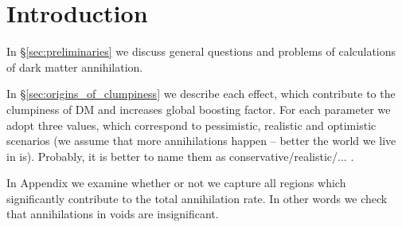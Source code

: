\section{Introduction}

In \S\ref{sec:preliminaries} we discuss general questions and problems of calculations of dark matter annihilation.

In \S\ref{sec:origins_of_clumpiness} we describe each effect, which contribute to the clumpiness of DM and increases global boosting factor. For each parameter we adopt three values, which correspond to pessimistic, realistic and optimistic scenarios (we assume that more annihilations happen -- better the world we live in is). Probably, it is better to name them as conservative/realistic/... .

In Appendix we examine whether or not we capture all regions which significantly contribute to the total annihilation rate. In other words we check that annihilations in voids are insignificant.
